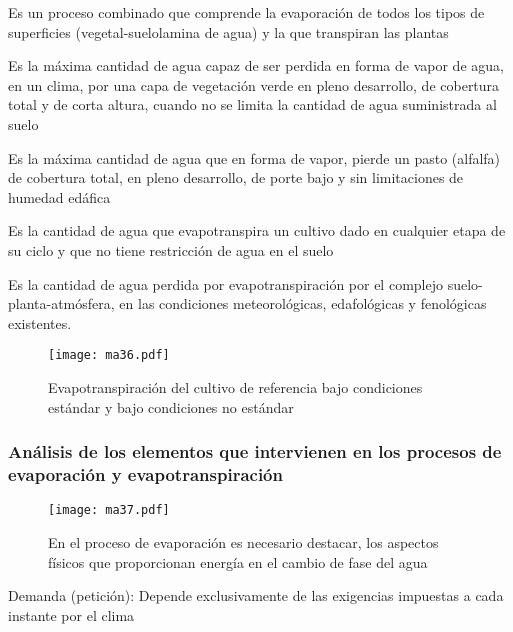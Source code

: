         \begin{definition}[Evapotranspiración $(ET)$]
            Es un proceso combinado que comprende la evaporación de todos los tipos de superficies (vegetal-suelolamina de agua) y la que transpiran las plantas
        \end{definition}
        \begin{definition}
            Es la máxima cantidad de agua capaz de ser perdida en forma de vapor de agua, en un clima, por una capa de vegetación verde en pleno desarrollo, de cobertura total y de corta altura, cuando no se limita la cantidad de agua suministrada al suelo
        \end{definition}
        \begin{definition}
            Es la máxima cantidad de agua que en forma de vapor, pierde un pasto (alfalfa) de cobertura total, en pleno desarrollo, de porte bajo y sin limitaciones de humedad edáfica
        \end{definition}
        \begin{definition}
            Es la cantidad de agua que evapotranspira un cultivo dado en cualquier etapa de su ciclo y que no tiene restricción de agua en el suelo
        \end{definition}
        \begin{definition}
            Es la cantidad de agua perdida por evapotranspiración por el complejo suelo-planta-atmósfera, en las condiciones meteorológicas, edafológicas y fenológicas existentes.
        \end{definition}
        \begin{figure}[h!]
            \centering
            \texttt{[image: ma36.pdf]}
            \caption{Evapotranspiración del cultivo de referencia bajo condiciones estándar y bajo condiciones no estándar}
            \label{ma36}
        \end{figure}
        \subsubsection{Análisis de los elementos que intervienen en los procesos de evaporación y evapotranspiración}
        \begin{figure}[h!]
        \centering
          \texttt{[image: ma37.pdf]}
          \caption{En el proceso de evaporación es necesario destacar, los aspectos físicos que proporcionan energía en el cambio de fase del agua  }
          \label{ma37}
        \end{figure}
        Demanda (petición): Depende exclusivamente de las exigencias impuestas a cada instante por el clima
        
